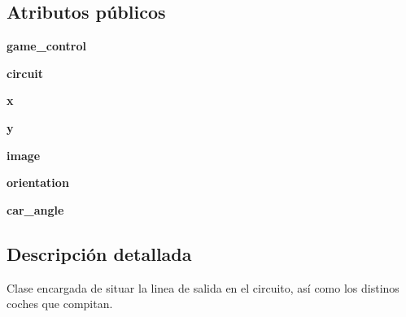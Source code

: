 \subsection*{\-Atributos públicos}
\begin{DoxyCompactItemize}
\item 
\hypertarget{classengine_1_1start_1_1Start_a14260dda74d639a4099dfa7778d86130}{
{\bfseries game\-\_\-control}}
\label{classengine_1_1start_1_1Start_a14260dda74d639a4099dfa7778d86130}

\item 
\hypertarget{classengine_1_1start_1_1Start_a735646c57a3bb84113769f4f4bc4b3b7}{
{\bfseries circuit}}
\label{classengine_1_1start_1_1Start_a735646c57a3bb84113769f4f4bc4b3b7}

\item 
\hypertarget{classengine_1_1start_1_1Start_aa09b9f1694fec4ca22165e15a670747b}{
{\bfseries x}}
\label{classengine_1_1start_1_1Start_aa09b9f1694fec4ca22165e15a670747b}

\item 
\hypertarget{classengine_1_1start_1_1Start_a282b5a28e85056ab57b122ef9de9405f}{
{\bfseries y}}
\label{classengine_1_1start_1_1Start_a282b5a28e85056ab57b122ef9de9405f}

\item 
\hypertarget{classengine_1_1start_1_1Start_a69beb8868fc70f9d917abb6f3cd86b53}{
{\bfseries image}}
\label{classengine_1_1start_1_1Start_a69beb8868fc70f9d917abb6f3cd86b53}

\item 
\hypertarget{classengine_1_1start_1_1Start_ac2cb06ccf1ec9e80fa366b77c6d8d3ff}{
{\bfseries orientation}}
\label{classengine_1_1start_1_1Start_ac2cb06ccf1ec9e80fa366b77c6d8d3ff}

\item 
\hypertarget{classengine_1_1start_1_1Start_a8264309cfedd84f2d83511c179afb508}{
{\bfseries car\-\_\-angle}}
\label{classengine_1_1start_1_1Start_a8264309cfedd84f2d83511c179afb508}

\end{DoxyCompactItemize}


\subsection{\-Descripción detallada}
\-Clase encargada de situar la linea de salida en el circuito, así como los distinos coches que compitan. 

